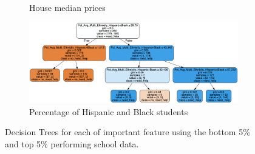 \documentclass[11pt]{article}
\begin{document}
\begin{figure}[h!]
\begin{subfigure}{0.8\textwidth}
         \caption{House median prices}
         \label{fig:dtree_specific_house}
\end{subfigure}
\hfill
\begin{subfigure}{0.9\textwidth}
         \centering
         \includegraphics[width=\textwidth]{recom_hispanic.png}
         \caption{Percentage of Hispanic and Black students}
         \label{fig:dtree_specific_hispanic}
\end{subfigure}
\caption{Decision Trees for each of important feature using the bottom 5\% and top 5\% performing school data.}
\label{fig:dtree_specific_features}
\end{figure}
%
%
\end{document}
